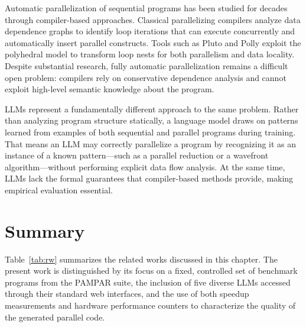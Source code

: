 Automatic parallelization of sequential programs has been studied for decades through compiler-based approaches. Classical parallelizing compilers analyze data dependence graphs to identify loop iterations that can execute concurrently and automatically insert parallel constructs. Tools such as Pluto  and Polly  exploit the polyhedral model to transform loop nests for both parallelism and data locality. Despite substantial research, fully automatic parallelization remains a difficult open problem: compilers rely on conservative dependence analysis and cannot exploit high-level semantic knowledge about the program.

LLMs represent a fundamentally different approach to the same problem. Rather than analyzing program structure statically, a language model draws on patterns learned from examples of both sequential and parallel programs during training. 
That means an LLM may correctly parallelize a program by recognizing it as an instance of a known pattern—such as a parallel reduction or a wavefront algorithm—without performing explicit data flow analysis. 
At the same time, LLMs lack the formal guarantees that compiler-based methods provide, making empirical evaluation essential.

\section{Summary}
\label{sec:rw_summary}

Table~\ref{tab:rw} summarizes the related works discussed in this chapter. The present work is distinguished by its focus on a fixed, controlled set of benchmark programs from the PAMPAR suite, the inclusion of five diverse LLMs accessed through their standard web interfaces, and the use of both speedup measurements and hardware performance counters to characterize the quality of the generated parallel code.

